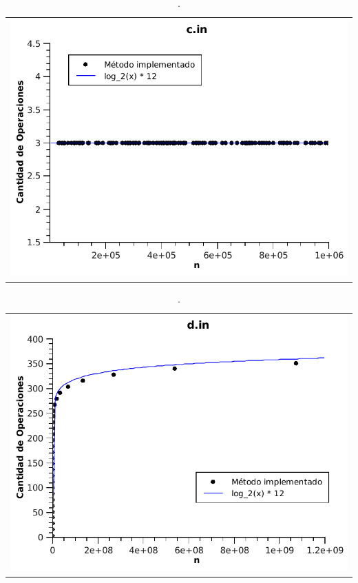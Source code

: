 	\begin{table}[h!]
		\centering 
			\begin{tabular}{c}
				\includegraphics[scale = 0.8]{./../ej1/tests/c.pdf}
			\end{tabular}
			\caption{.}
			\label{grafico3} 
	\end{table}

	\begin{table}[h!]
		\centering 
			\begin{tabular}{c}
				\includegraphics[scale = 0.8]{./../ej1/tests/d.pdf}
			\end{tabular}
			\caption{.} 
			\label{grafico4} 
	\end{table}

